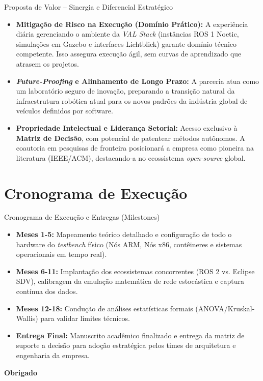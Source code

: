\documentclass[aspectratio=169,xcolor=dvipsnames]{beamer}
\begin{document}
\begin{frame}{Proposta de Valor -- Sinergia e Diferencial Estratégico}
    \begin{itemize}
        \item \textbf{Mitigação de Risco na Execução (Domínio Prático):} A experiência diária gerenciando o ambiente da \textit{VAL Stack} (instâncias ROS 1 Noetic, simulações em Gazebo e interfaces Lichtblick) garante domínio técnico competente. Isso assegura execução ágil, sem curvas de aprendizado que atrasem os projetos.

              \vspace{1.5ex}
        \item \textbf{\textit{Future-Proofing} e Alinhamento de Longo Prazo:} A parceria atua como um laboratório seguro de inovação, preparando a transição natural da infraestrutura robótica atual para os novos padrões da indústria global de veículos definidos por software.

              \vspace{1.5ex}
        \item \textbf{Propriedade Intelectual e Liderança Setorial:} Acesso exclusivo à \textbf{Matriz de Decisão}, com potencial de patentear métodos autônomos. A coautoria em pesquisas de fronteira posicionará a empresa como pioneira na literatura (IEEE/ACM), destacando-a no ecossistema \textit{open-source} global.
    \end{itemize}
\end{frame}
\section{Cronograma de Execução}

\begin{frame}{Cronograma de Execução e Entregas (Milestones)}
    \begin{itemize}
        \item \textbf{Meses 1-5:} Mapeamento teórico detalhado e configuração de todo o hardware do \textit{testbench} físico (Nós ARM, Nós x86, contêineres e sistemas operacionais em tempo real).
        \item \textbf{Meses 6-11:} Implantação dos ecossistemas concorrentes (ROS 2 vs. Eclipse SDV), calibragem da emulação matemática de rede estocástica e captura contínua dos dados.
        \item \textbf{Meses 12-18:} Condução de análises estatísticas formais (ANOVA/Kruskal-Wallis) para validar limites técnicos.
        \item \textbf{Entrega Final:} Manuscrito acadêmico finalizado e entrega da matriz de suporte a decisão para adoção estratégica pelos times de arquitetura e engenharia da empresa.
    \end{itemize}
\end{frame}


\begin{frame}
    \Huge{\centerline{\textbf{Obrigado}}}
\end{frame}
\end{document}
